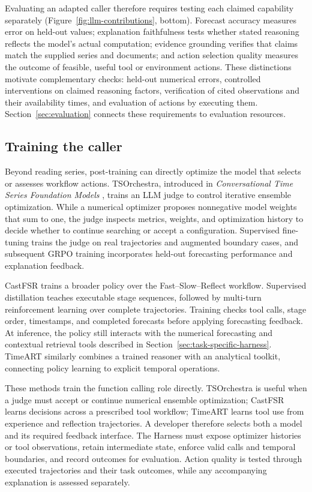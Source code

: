 \documentclass[preprints,article,submit,moreauthors]{Definitions/mdpi}
\begin{document}
Evaluating an adapted caller therefore requires testing each claimed capability separately (Figure~\ref{fig:llm-contributions}, bottom). Forecast accuracy measures error on held-out values; explanation faithfulness tests whether stated reasoning reflects the model's actual computation; evidence grounding verifies that claims match the supplied series and documents; and action selection quality measures the outcome of feasible, useful tool or environment actions. These distinctions motivate complementary checks: held-out numerical errors, controlled interventions on claimed reasoning factors, verification of cited observations and their availability times, and evaluation of actions by executing them. Section~\ref{sec:evaluation} connects these requirements to evaluation resources.

\subsection{Training the caller}
\label{sec:llm-caller}

Beyond reading series, post-training can directly optimize the model that selects or assesses workflow actions. TSOrchestra, introduced in \textit{Conversational Time Series Foundation Models} \citep{conversationaltsfm2025}, trains an LLM judge to control iterative ensemble optimization. While a numerical optimizer proposes nonnegative model weights that sum to one, the judge inspects metrics, weights, and optimization history to decide whether to continue searching or accept a configuration. Supervised fine-tuning trains the judge on real trajectories and augmented boundary cases, and subsequent GRPO training incorporates held-out forecasting performance and explanation feedback.

CastFSR \citep{castfsr2026} trains a broader policy over the Fast--Slow--Reflect workflow. Supervised distillation teaches executable stage sequences, followed by multi-turn reinforcement learning over complete trajectories. Training checks tool calls, stage order, timestamps, and completed forecasts before applying forecasting feedback. At inference, the policy still interacts with the numerical forecasting and contextual retrieval tools described in Section~\ref{sec:task-specific-harness}. TimeART \citep{timeart2026} similarly combines a trained reasoner with an analytical toolkit, connecting policy learning to explicit temporal operations.

These methods train the function calling role directly. TSOrchestra \citep{conversationaltsfm2025} is useful when a judge must accept or continue numerical ensemble optimization; CastFSR \citep{castfsr2026} learns decisions across a prescribed tool workflow; TimeART \citep{timeart2026} learns tool use from experience and reflection trajectories. A developer therefore selects both a model and its required feedback interface. The Harness must expose optimizer histories or tool observations, retain intermediate state, enforce valid calls and temporal boundaries, and record outcomes for evaluation. Action quality is tested through executed trajectories and their task outcomes, while any accompanying explanation is assessed separately.
\end{document}
